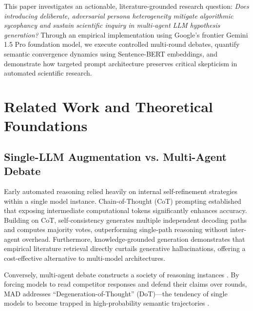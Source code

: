 \documentclass[conference,onecolumn]{IEEEtran}
\begin{document}
This paper investigates an actionable, literature-grounded research question: \textit{Does introducing deliberate, adversarial persona heterogeneity mitigate algorithmic sycophancy and sustain scientific inquiry in multi-agent LLM hypothesis generation?} Through an empirical implementation using Google's frontier Gemini 1.5 Pro foundation model, we execute controlled multi-round debates, quantify semantic convergence dynamics using Sentence-BERT embeddings, and demonstrate how targeted prompt architecture preserves critical skepticism in automated scientific research.

\section{Related Work and Theoretical Foundations}

\subsection{Single-LLM Augmentation vs. Multi-Agent Debate}
Early automated reasoning relied heavily on internal self-refinement strategies within a single model instance. Chain-of-Thought (CoT) prompting \cite{wei2022chain} established that exposing intermediate computational tokens significantly enhances accuracy. Building on CoT, self-consistency \cite{wang2023self} generates multiple independent decoding paths and computes majority votes, outperforming single-path reasoning without inter-agent overhead. Furthermore, knowledge-grounded generation \cite{xiong2024improving} demonstrates that empirical literature retrieval directly curtails generative hallucinations, offering a cost-effective alternative to multi-model architectures.

Conversely, multi-agent debate constructs a society of reasoning instances \cite{du2023improving}. By forcing models to read competitor responses and defend their claims over rounds, MAD addresses ``Degeneration-of-Thought'' (DoT)—the tendency of single models to become trapped in high-probability semantic trajectories \cite{liang2024encouraging}.
\end{document}
